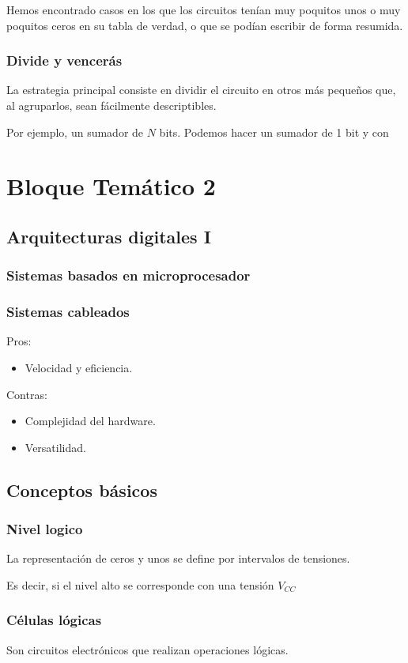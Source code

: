 \documentclass[a4paper]{book}
\begin{document}
Hemos encontrado casos en los que los circuitos tenían muy poquitos unos o muy poquitos ceros en su tabla de verdad, o que se podían escribir de forma resumida.

\subsection{Divide y vencerás}
La estrategia principal consiste en dividir el circuito en otros más pequeños que, al agruparlos, sean fácilmente descriptibles.

Por ejemplo, un sumador de $N$ bits. Podemos hacer un sumador de 1 bit y con

\chapter{Bloque Temático 2}
\section{Arquitecturas digitales I}
\subsection{Sistemas basados en microprocesador}
\subsection{Sistemas cableados}
Pros: \begin{itemize}
	\item Velocidad y eficiencia.
\end{itemize}
Contras: \begin{itemize}
	\item Complejidad del hardware.
	\item Versatilidad.
\end{itemize}

\section{Conceptos básicos}
\subsection{Nivel logico}
La representación de ceros y unos se define por intervalos de tensiones.

Es decir, si el nivel alto se corresponde con una tensión $V_{CC}$

\subsection{Células lógicas}
Son circuitos electrónicos que realizan operaciones lógicas.
\end{document}
